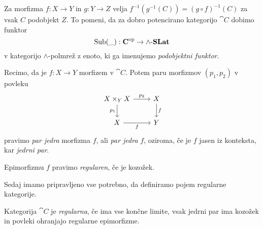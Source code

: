\documentclass[../kategoricna_logika.tex]{subfiles}
\begin{document}
Za morfizma $f : X \to Y$ in $g : Y \to Z$ velja $f^{-1}(g^{-1}(C)) = (g \circ f)^{-1}(C)$
za vsak $C$ podobjekt $Z$.
To pomeni, da za dobro potencirano kategorijo $\cat{C}$ dobimo funktor
$$\operatorname{Sub}(\_) : {\operatorname{\mathbf{C}}}^{\mathrm{op}} \to {\operatorname{\mathbf{\wedge-\mathbf{SLat}}}}$$
v kategorijo $\land$-polmrež z enoto, ki ga imenujemo \emph{podobjektni
  funktor}.
\begin{definicija}
  Recimo, da je $f : X \to Y$ morfizem v $\cat{C}$. Potem paru
  morfizmov $(p_1, p_2)$ v povleku
  \begin{equation*}
    \begin{tikzcd}
      X \times_Y X \ar[d, "p_1"'] \ar[r, "p_2"] & X \ar[d, "f"] \\
      X \ar[r, "f"'] & Y
    \end{tikzcd}
  \end{equation*}
  pravimo \emph{par jedra} morfizma $f$, ali \emph{par jedra} $f$,
  oziroma, če je $f$ jasen iz konteksta, kar \emph{jedrni par}.
\end{definicija}
\begin{definicija}
  Epimorfizmu $f$ pravimo \emph{regularen}, če je kozožek.
\end{definicija}
Sedaj imamo pripravljeno vse potrebno, da definiramo pojem regularne
kategorije.
\begin{definicija}
  Kategorija $\cat{C}$ je \emph{regularna}, če ima vse končne limite,
  vsak jedrni par ima kozožek in povleki ohranjajo
  regularne epimorfizme.
\end{definicija}
\end{document}
